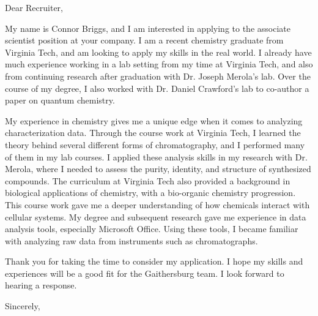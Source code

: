 \documentclass[12pt]{letter}
\begin{document}
\begin{letter}{}

  \opening{Dear Recruiter,}

  My name is Connor Briggs, and I am interested in applying to the associate scientist position at your company. I am a recent chemistry graduate from Virginia Tech, and am looking to apply my skills in the real world. I already have much experience working in a lab setting from my time at Virginia Tech, and also from continuing research after graduation with Dr. Joseph Merola's lab. Over the course of my degree, I also worked with Dr. Daniel Crawford's lab to co-author a paper on quantum chemistry.
  
  
  My experience in chemistry gives me a unique edge when it comes to analyzing characterization data. Through the course work at Virginia Tech, I learned the theory behind several different forms of chromatography, and I performed many of them in my lab courses. I applied these analysis skills in my research with Dr. Merola, where I needed to assess the purity, identity, and structure of synthesized compounds. The curriculum at Virginia Tech also provided a background in biological applications of chemistry, with a bio-organic chemistry progression. This course work gave me a deeper understanding of how chemicals interact with cellular systems. My degree and subsequent research gave me experience in data analysis tools, especially Microsoft Office. Using these tools, I became familiar with analyzing raw data from instruments such as chromatographs.


  Thank you for taking the time to consider my application. I hope my skills and experiences will be a good fit for the Gaithersburg team. I look forward to hearing a response.
  
  
\closing{Sincerely,}
  
\end{letter}
\end{document}
